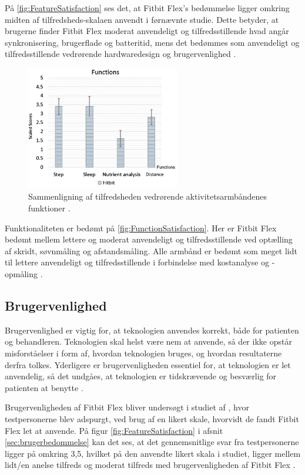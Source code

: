 \noindent
På \autoref{fig:FeatureSatisfaction} ses det, at Fitbit Flex's bedømmelse ligger omkring midten af tilfredsheds-skalaen anvendt i førnævnte studie. Dette betyder, at brugerne finder Fitbit Flex moderat anvendeligt og tilfredsstillende hvad angår synkronisering, brugerflade og batteritid, mens det bedømmes som anvendeligt og tilfredsstillende vedrørende hardwaredesign og brugervenlighed \citep{kaewkannate2016}.

\begin{figure}[H]
	\centering
	\includegraphics[width=0.6\textwidth]{figures/FunctionSatisfaction2}
	\caption{Sammenligning af tilfredsheden vedrørende aktivitetsarmbåndenes funktioner \citep{kaewkannate2016}.}
	\label{fig:FunctionSatisfaction}
\end{figure}

\noindent
Funktionaliteten er bedømt på \autoref{fig:FunctionSatisfaction}. Her er Fitbit Flex bedømt mellem lettere og moderat anvendeligt og tilfredsstillende ved optælling af skridt, søvnmåling og afstandsmåling. Alle armbånd er bedømt som meget lidt til lettere anvendeligt og tilfredsstillende i forbindelse med kostanalyse og -opmåling \citep{kaewkannate2016}.

\subsection{Brugervenlighed}

Brugervenlighed er vigtig for, at teknologien anvendes korrekt, både for patienten og behandleren. Teknologien skal helst være nem at anvende, så der ikke opstår misforståelser i form af, hvordan teknologien bruges, og hvordan resultaterne derfra tolkes. Yderligere er brugervenligheden essentiel for, at teknologien er let anvendelig, så det undgåes, at teknologien er tidskrævende og besværlig for patienten at benytte \citep{Nordgren2013}. 

Brugervenligheden af Fitbit Flex bliver undersøgt i studiet af \citeauthor{kaewkannate2016}, hvor testpersonerne blev adspurgt, ved brug af en likert skale, hvorvidt de fandt Fitbit Flex let at anvende. På figur \autoref{fig:FeatureSatisfaction} i afsnit \autoref{sec:brugerbedommelse} kan det ses, at det gennemsnitlige svar fra testpersonerne ligger på omkring 3,5, hvilket på den anvendte likert skala i studiet, ligger mellem lidt/en anelse tilfreds og moderat tilfreds med brugervenligheden af Fitbit Flex \citep{kaewkannate2016}.

